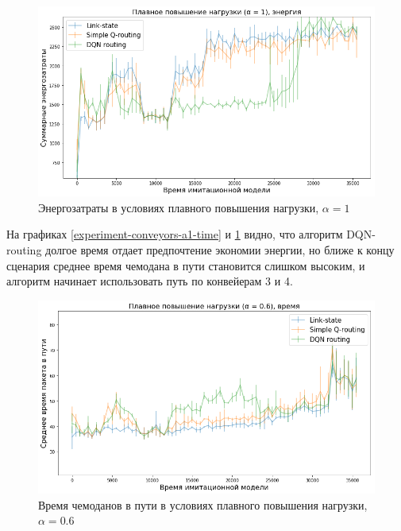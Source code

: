 \documentclass[specification, annotation]{itmo-student-thesis}
\begin{document}
\begin{figure}[!h]
  \caption{Энергозатраты в условиях плавного повышения нагрузки, $\alpha =
    1$}\label{experiment-conveyors-a1-energy}
  \centering
  \includegraphics[scale=0.6]{experiment-conveyors-a1-energy}
\end{figure}

На графиках \ref{experiment-conveyors-a1-time} и
\ref{experiment-conveyors-a1-energy} видно, что алгоритм DQN-routing долгое
время отдает предпочтение экономии энергии, но ближе к концу сценария среднее
время чемодана в пути становится слишком высоким, и алгоритм начинает
использовать путь по конвейерам 3 и 4.

\begin{figure}[!h]
  \caption{Время чемоданов в пути в условиях плавного повышения нагрузки,
    $\alpha = 0.6$}\label{experiment-conveyors-a06-time}
  \centering
  \includegraphics[scale=0.6]{experiment-conveyors-a06-time}
\end{figure}
\end{document}
